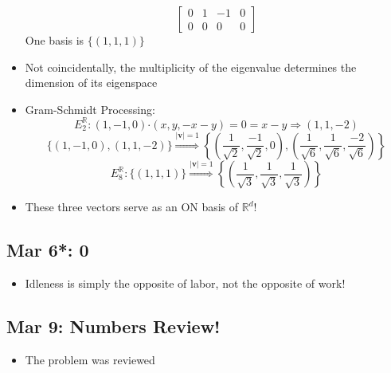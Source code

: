 \documentclass[10pt, oneside]{article}
\newcommand{\R}{\mathbb{R}}
\newcommand{\Cdot}{\boldsymbol{\cdot}}
\renewcommand{\vec}[1]{\mathbf{#1}}
\begin{document}
\begin{itemize}
\[\begin{bmatrix}
            0 & 1 & -1 & 0\\
            0 & 0 & 0 & 0
        \end{bmatrix}
        \]
        One basis is $\{(1,1,1)\}$
    \item Not coincidentally, the multiplicity of the eigenvalue determines the dimension of its eigenspace
    \item Gram-Schmidt Processing:
        \[E^\R_2: (1,-1,0)\Cdot(x,y,-x-y) = 0 = x - y \Rightarrow (1,1,-2)\]
        \[\{(1,-1,0),(1,1,-2)\} \overset{|\vec{v}| = 1}{\Rightarrow} \left\{\left(\frac{1}{\sqrt{2}},\frac{-1}{\sqrt{2}},0\right),\left(\frac{1}{\sqrt{6}},\frac{1}{\sqrt{6}},\frac{-2}{\sqrt{6}}\right)\right\}\]
        \[E^\R_8: \{(1,1,1)\} \overset{|\vec{v}| = 1}{\Rightarrow} \left\{\left(\frac{1}{\sqrt{3}},\frac{1}{\sqrt{3}},\frac{1}{\sqrt{3}}\right)\right\}\]
    \item These three vectors serve as an ON basis of $\R^d$!
\end{itemize}

\subsection{Mar 6*: 0}
\begin{itemize}
    \item Idleness is simply the opposite of labor, not the opposite of work!
\end{itemize}

\subsection{Mar 9: Numbers Review!}
\begin{itemize}
    \item The problem was reviewed
\end{itemize}
\end{document}
